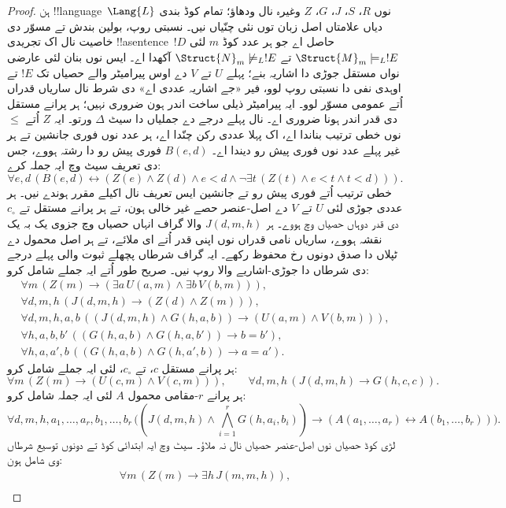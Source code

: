 \documentclass[../../../include/open-logic-section]{subfiles}
\begin{document}
\begin{proof}
ہن !!{language}~$\Lang{L}$ نوں $R$، $S$، $J$، $G$،
$Z$ وغیرہ نال ودھاؤ؛ تمام کوڈ بندی دیاں علامتاں اصل زبان
توں نئی چنّیاں نیں۔ نسبتی روپ، بولین بندش تے مسوّر دی
خاصیت نال اک تجریدی !!a{sentence}~$!D$ حاصل اے جو ہر
عدد کوڈ $m$ لئی $\Struct{M}_m\models_L !E$ تے
$\Struct{N}_m\not\models_L !E$ آکھدا اے۔ ایس نوں
بنان لئی عارضی نواں مستقل جوڑی دا اشاریہ بنے؛ پہلے $U$
تے $V$ دے اوس پیرامیٹر والے حصیاں تک $!E$ تے اوہدی نفی
دا نسبتی روپ لوو، فیر «جے اشاریہ عددی اے» دی شرط نال ساریاں
قدراں اُتے عمومی مسوّر لوو۔ ایہ پیرامیٹر ذیلی ساخت اندر ہون
ضروری نہیں؛ ہر پرانے مستقل دی قدر اندر ہونا ضروری اے۔ نال
پہلے درجے دے جملیاں دا سیٹ $\Delta$ ورتو۔ ایہ $Z$ اُتے
$\le$ نوں خطی ترتیب بناندا اے، اک پہلا عددی رکن چنّدا اے،
ہر عدد نوں فوری جانشین تے ہر غیر پہلے عدد نوں فوری پیش رو
دیندا اے۔ $B(e,d)$ فوری پیش رو دا رشتہ ہووے، جس دی تعریف
سیٹ وچ ایہ جملہ کرے:
\[
\forall e,d\,(B(e,d)\leftrightarrow
(Z(e)\land Z(d)\land e<d\land
\neg\exists t\,(Z(t)\land e<t\land t<d))).
\]
خطی ترتیب اُتے فوری پیش رو تے جانشین ایس تعریف نال اکیلے
مقرر ہوندے نیں۔ ہر عددی جوڑی
لئی $U$ تے $V$ دے اصل-عنصر حصے غیر خالی ہون، تے ہر
پرانے مستقل تے $c_\circ$ دی قدر دوہاں حصیاں وچ ہووے۔ ہر
$J(d,m,h)$ والا گراف انہاں حصیاں وچ جزوی یک بہ یک نقشہ
ہووے، ساریاں نامی قدراں نوں اپنی قدر اُتے ای ملائے، تے ہر
اصل محمول دے ٹپلاں دا صدق دونوں رخ محفوظ رکھے۔ ایہ گراف
شرطاں پچھلے ثبوت والی پہلے درجے دی شرطاں دا جوڑی-اشاریے
والا روپ نیں۔ صریح طور اُتے ایہ جملے شامل کرو:
\[
\begin{gathered}
\forall m\,(Z(m)\to(\exists a\,U(a,m)\land\exists b\,V(b,m))),\\
\forall d,m,h\,(J(d,m,h)\to(Z(d)\land Z(m))),\\
\forall d,m,h,a,b\,((J(d,m,h)\land G(h,a,b))\to(U(a,m)\land V(b,m))),\\
\forall h,a,b,b'\,((G(h,a,b)\land G(h,a,b'))\to b=b'),\\
\forall h,a,a',b\,((G(h,a,b)\land G(h,a',b))\to a=a').
\end{gathered}
\]
ہر پرانے مستقل $c$، تے $c_\circ$، لئی ایہ جملے شامل کرو:
\[
\forall m\,(Z(m)\to(U(c,m)\land V(c,m))),\qquad
\forall d,m,h\,(J(d,m,h)\to G(h,c,c)).
\]
ہر پرانے $r$-مقامی محمول $A$ لئی ایہ جملہ شامل کرو:
\[
\forall d,m,h,a_1,\ldots,a_r,b_1,\ldots,b_r\,
\bigl((J(d,m,h)\land\bigwedge_{i=1}^{r}G(h,a_i,b_i))\to
(A(a_1,\ldots,a_r)\leftrightarrow A(b_1,\ldots,b_r))\bigr).
\]
لڑی کوڈ حصیاں نوں اصل-عنصر حصیاں نال نہ ملاؤ۔ سیٹ وچ ایہ
ابتدائی کوڈ تے دونوں توسیع شرطاں وی شامل ہون:
\[
\begin{gathered}
\forall m\,(Z(m)\to\exists h\,J(m,m,h)),\\

\end{gathered}\]
\end{proof}
\end{document}
